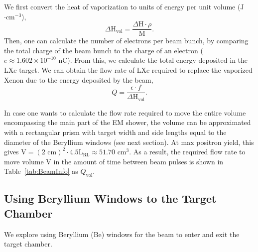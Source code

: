 \documentclass[%
reprint,
nofootinbib,
amsmath, amssymb,
aps,
floatfix,
]{revtex4-2}
\begin{document}
We first convert the heat of vaporization to units of energy per unit volume (J$\cdot \textrm{cm}^{-3}$),
\begin{equation}
    \Delta \textrm{H}_\textrm{vol} = \frac{\Delta \textrm{H}\cdot \rho}{\textrm{M}}. \label{eq:HoV}
\end{equation}
Then, one can calculate the number of electrons per beam bunch, by comparing the 
total charge of the beam bunch to the charge of an electron
($e \approx 1.602 \times 10^{-10}$ nC).
From this, we calculate the total energy deposited in the LXe target.
We can obtain the flow rate of LXe required to replace the vaporized Xenon due
to the energy deposited by the beam,
\begin{equation}
    Q = \frac{\epsilon \cdot f}{\Delta \textrm{H}_{\textrm{vol}}}.
\label{eq:Q}
\end{equation}
    

In case one wants to calculate the flow rate required to move the entire volume encompassing the main
part of the EM shower, the volume can be approximated with a rectangular prism with target width and
side lengths equal to the diameter of the Beryllium windows (see next section).  At max positron yield,
this gives 
\linebreak $\textrm{V} = (2 \textrm{ cm})^2 \cdot 4.5\textrm{L}_{\textrm{RL}} \approx 51.70 \textrm{ cm}^3$.
As a result, the required flow rate to move volume V in the amount of time between beam pulses is
shown in Table~\ref{tab:BeamInfo} as $Q_\textrm{vol}$.

\subsection{Using Beryllium Windows to the Target Chamber}
We explore using Beryllium (Be) windows for the beam to enter and exit the target chamber.
\end{document}
